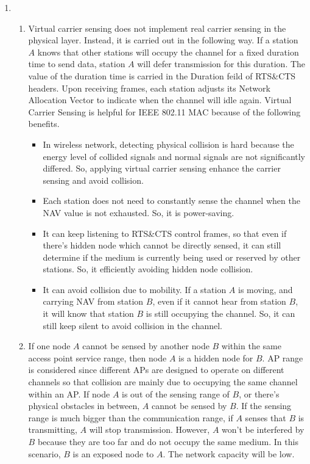 \documentclass{article}
\begin{document}
\begin{enumerate}
    \item
    \begin{enumerate}
        \item Virtual carrier sensing does not implement real carrier sensing in the physical layer. Instead, it is carried out in the following way. If a station $A$ knows that other stations will occupy the channel for a fixed duration time to send data, station $A$ will defer transmission for this duration. The value of the duration time is carried in the Duration feild of RTS\&CTS headers. Upon receiving frames, each station adjusts its Network Allocation Vector to indicate when the channel will idle again.
        \newline Virtual Carrier Sensing is helpful for IEEE 802.11 MAC  because of the following benefits.
        \begin{itemize}
            \item In wireless network, detecting physical collision is hard because the energy level of collided signals and normal signals are not significantly differed. So, applying virtual carrier sensing enhance the carrier sensing and avoid collision.
            \item Each station does not need to constantly sense the channel when the NAV value is not exhausted. So, it is power-saving.
            \item It can keep listening to RTS&CTS control frames, so that even if there's hidden node which cannot be directly sensed, it can still determine if the medium is currently being used or reserved by other stations. So, it efficiently avoiding hidden node collision. 
            \item It can avoid collision due to mobility. If a station $A$ is moving, and carrying NAV from station $B$, even if it cannot hear from station $B$, it will know that station $B$ is still occupying the channel. So, it can still keep silent to avoid collision in the channel.
        \end{itemize}
        
        \item
        If one node $A$ cannot be sensed by another node $B$ within the same access point service range, then node $A$ is a hidden node for $B$. AP range is considered since different APs are designed to operate on different channels so that collision are mainly due to occupying the same channel within an AP. If node $A$ is out of the sensing range of $B$, or there's physical obstacles in between, $A$ cannot be sensed by $B$. 
        \newline
        If the sensing range is much bigger than the communication range, if $A$ senses that $B$ is transmitting, $A$ will stop transmission. However, $A$ won't be interfered by $B$ because they are too far and do not occupy the same medium. In this scenario, $B$ is an exposed node to $A$. The network capacity will be low.
        

\end{enumerate}
\end{enumerate}
\end{document}
